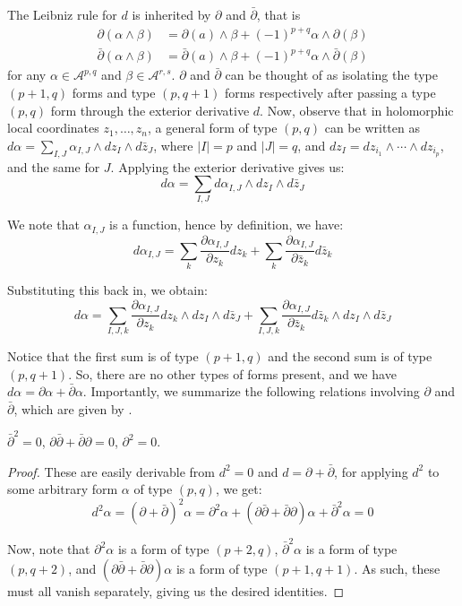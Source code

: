 \noindent The Leibniz rule for $d$ is inherited by $\partial$ and $\bar \partial$, that is
\begin{align*}
    \partial(\alpha \wedge \beta) &= \partial(a)\wedge \beta +(-1)^{p+q} \alpha\wedge \partial(\beta) \\
    \bar\partial(\alpha \wedge \beta) &= \bar\partial(a)\wedge \beta +(-1)^{p+q} \alpha\wedge \bar\partial(\beta)
\end{align*}
for any $\alpha\in \mathcal{A}^{p,q}$ and $\beta\in \mathcal{A}^{r,s}$. $\partial$ and $\bar\partial$ can be thought of as isolating the type $(p+1,q)$ forms and type $(p,q+1)$ forms respectively after passing a type $(p,q)$ form through the exterior derivative $d$. Now, observe that in holomorphic local coordinates $z_1,\ldots, z_n$, a general form of type $(p,q)$ can be written as $d\alpha = \sum_{I,J}\alpha_{I,J}\wedge dz_I \wedge d\bar z_J$, where $|I|=p$ and $|J|=q$, and $dz_I = dz_{i_1}\wedge \cdots \wedge dz_{i_p}$, and the same for $J$. Applying the exterior derivative gives us:
$$
d\alpha = \sum_{I,J}d\alpha_{I,J}\wedge dz_I \wedge d\bar z_J
$$

\noindent We note that $\alpha_{I,J}$ is a function, hence by definition, we have:
$$
d\alpha_{I,J} = \sum_{k}\frac{\partial \alpha_{I,J}}{\partial z_k}dz_k + \sum_{k} \frac{\partial\alpha_{I,J}}{\partial \bar z_k}d\bar z_k
$$

\noindent Substituting this back in, we obtain:
$$
d\alpha =\sum_{I,J,k}\frac{\partial \alpha_{I,J}}{\partial z_k}dz_k\wedge dz_I \wedge d\bar z_J + \sum_{I,J,k} \frac{\partial\alpha_{I,J}}{\partial \bar z_k}d\bar z_k \wedge dz_I \wedge d\bar z_J
$$

\noindent Notice that the first sum is of type $(p+1,q)$ and the second sum is of type $(p,q+1)$. So, there are no other types of forms present, and we have $d\alpha = \partial \alpha + \bar\partial \alpha$. Importantly, we summarize the following relations involving $\partial$ and $\bar \partial$, which are given by \cite[Lemma 2.29]{VoisinI2002}.
\begin{lemma}
    $\bar\partial^2 =0$, $\partial\bar\partial + \bar\partial \partial =0$, $\partial^2=0$.
\end{lemma}
\begin{proof}
    These are easily derivable from $d^2=0$ and $d=\partial + \bar\partial$, for applying $d^2$ to some arbitrary form $\alpha$ of type $(p,q)$, we get:
$$
d^2\alpha = (\partial + \bar\partial)^2 \alpha = \partial^2 \alpha + (\partial\bar\partial + \bar\partial \partial)\alpha + \bar\partial^2 \alpha = 0
$$

\noindent Now, note that $\partial^2\alpha$ is a form of type $(p+2,q)$, $\bar\partial^2\alpha$ is a form of type $(p,q+2)$, and $(\partial\bar\partial + \bar\partial \partial)\alpha$ is a form of type $(p+1,q+1)$. As such, these must all vanish separately, giving us the desired identities. 
\end{proof}


